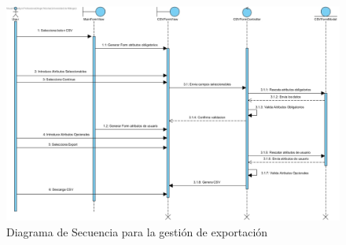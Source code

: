 \begin{figure}[H]
    \includegraphics[width=1\linewidth]{assets/sequence/RF8.jpg}
    \caption{Diagrama de Secuencia para la gestión de exportación}
\end{figure}
